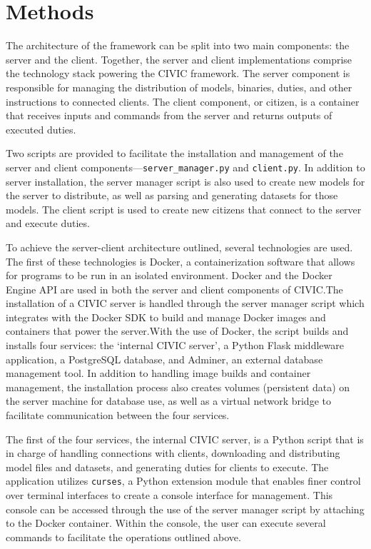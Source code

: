\documentclass[11pt]{article}
\begin{document}
\section{Methods}

The architecture of the framework can be split into two main components: the server and the client. Together, the server and client implementations comprise the technology stack powering the CIVIC framework. The server component is responsible for managing the distribution of models, binaries, duties, and other instructions to connected clients. The client component, or citizen, is a container that receives inputs and commands from the server and returns outputs of executed duties.

Two scripts are provided to facilitate the installation and management of the server and client components---\verb|server_manager.py| and \verb|client.py|. In addition to server installation, the server manager script is also used to create new models for the server to distribute, as well as parsing and generating datasets for those models. The client script is used to create new citizens that connect to the server and execute duties.

To achieve the server-client architecture outlined, several technologies are used. The first of these technologies is Docker, a containerization software that allows for programs to be run in an isolated environment. Docker and the Docker Engine API are used in both the server and client components of CIVIC.\@ The installation of a CIVIC server is handled through the server manager script which integrates with the Docker SDK to build and manage Docker images and containers that power the server.\@ With the use of Docker, the script builds and installs four services: the `internal CIVIC server', a Python Flask middleware application, a PostgreSQL database, and Adminer, an external database management tool. In addition to handling image builds and container management, the installation process also creates volumes (persistent data) on the server machine for database use, as well as a virtual network bridge to facilitate communication between the four services. 

The first of the four services, the internal CIVIC server, is a Python script that is in charge of handling connections with clients, downloading and distributing model files and datasets, and generating duties for clients to execute. The application utilizes \verb|curses|, a Python extension module that enables finer control over terminal interfaces to create a console interface for management. This console can be accessed through the use of the server manager script by attaching to the Docker container. Within the console, the user can execute several commands to facilitate the operations outlined above. 
\end{document}
